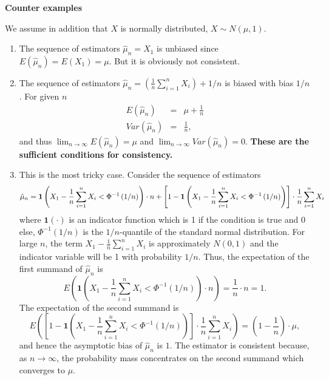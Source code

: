 \begin{Solution}{10.1}
\textbf{Counter examples}

We assume in addition that $X$ is normally distributed, $X\sim N\left( \mu
,1\right) $.

\begin{enumerate}
\item The sequence of estimators $\hat{\mu}_{n}=X_{1}$ is unbiased since $%
E\left( \hat{\mu}_{n}\right) =E\left( X_{1}\right) =\mu $. But it is
obviously not consistent.

\item The sequence of estimators $\hat{\mu}_{n}=\left( \frac{1}{n}%
\sum_{i=1}^{n}X_{i}\right) +1/n$ is biased with bias $1/n$. For given $n$
\begin{eqnarray*}
E\left( \hat{\mu}_{n}\right)  &=&\mu +\frac{1}{n} \\
Var\left( \hat{\mu}_{n}\right)  &=&\frac{1}{n},
\end{eqnarray*}%
and thus $\lim_{n\rightarrow \infty }E\left( \hat{\mu}_{n}\right) =\mu $
and $\lim_{n\rightarrow \infty }Var\left( \hat{\mu}_{n}\right) =0$.
\textbf{These are the sufficient conditions for consistency.}

\item This is the most tricky case. Consider the sequence of estimators%
\begin{equation*}
\hat{\mu}_{n}=\mathbf{1}\left( X_{1}-\frac{1}{n}\sum_{i=1}^{n}X_{i}<\Phi
^{-1}\left( 1/n\right) \right) \cdot n+\left[ 1-\mathbf{1}\left( X_{1}-\frac{%
1}{n}\sum_{i=1}^{n}X_{i}<\Phi ^{-1}\left( 1/n\right) \right) \right] \cdot
\frac{1}{n}\sum_{i=1}^{n}X_{i}
\end{equation*}%
where $\mathbf{1}\left( \cdot \right) $ is an indicator function which is 1
if the condition is true and 0 else, $\Phi ^{-1}\left( 1/n\right) $ is the $%
1/n$-quantile of the standard normal distribution. For large $n$, the term $%
X_{1}-\frac{1}{n}\sum_{i=1}^{n}X_{i}$ is approximately $N\left( 0,1\right) $
and the indicator variable will be 1 with probability $1/n$. Thus, the
expectation of the first summand of $\hat{\mu}_{n}$ is%
\begin{equation*}
E\left( \mathbf{1}\left( X_{1}-\frac{1}{n}\sum_{i=1}^{n}X_{i}<\Phi
^{-1}\left( 1/n\right) \right) \cdot n\right) =\frac{1}{n}\cdot n=1.
\end{equation*}%
The expectation of the second summand is%
\begin{equation*}
E\left( \left[ 1-\mathbf{1}\left( X_{1}-\frac{1}{n}\sum_{i=1}^{n}X_{i}<\Phi
^{-1}\left( 1/n\right) \right) \right] \cdot \frac{1}{n}\sum_{i=1}^{n}X_{i}%
\right) =\left( 1-\frac{1}{n}\right) \cdot \mu ,
\end{equation*}%
and hence the asymptotic bias of $\hat{\mu}_{n}$ is $1$. The estimator is
consistent because, as $n\rightarrow \infty $, the probability mass
concentrates on the second summand which converges to $\mu $.
\end{enumerate}
\end{Solution}
